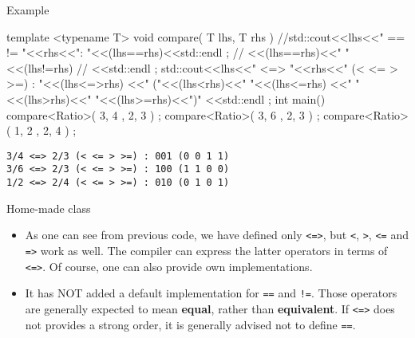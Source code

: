 \begin{frame}[fragile]
  \scriptsize
  \begin{exampleblock}{Example}
    \begin{cppcode*}{}
    template <typename T>
    void compare( T lhs, T rhs )
    {
      //std::cout<<lhs<<" == != "<<rhs<<": "<<(lhs==rhs)<<std::endl ;
      //  <<(lhs==rhs)<<" "<<(lhs!=rhs)
      //  <<std::endl ;
      std::cout<<lhs<<" <=> "<<rhs<<" (< <= > >=) : "<<(lhs<=>rhs)
        <<" ("<<(lhs<rhs)<<" "<<(lhs<=rhs)
        <<" "<<(lhs>rhs)<<" "<<(lhs>=rhs)<<")"
        <<std::endl ;
    }
    int main()
    {
      compare<Ratio>({ 3, 4 },{ 2, 3 }) ;
      compare<Ratio>({ 3, 6 },{ 2, 3 }) ;
      compare<Ratio>({ 1, 2 },{ 2, 4 }) ;
    }
     \end{cppcode*}
  \end{exampleblock}
  \begin{Verbatim}
3/4 <=> 2/3 (< <= > >=) : 001 (0 0 1 1)
3/6 <=> 2/3 (< <= > >=) : 100 (1 1 0 0)
1/2 <=> 2/4 (< <= > >=) : 010 (0 1 0 1)
  \end{Verbatim}
\end{frame}

\begin{frame}[fragile]
  \begin{block}{Home-made class}
    \begin{itemize}
      \item As one can see from previous code, we have defined only \texttt{<=>}, but \texttt{<}, \texttt{>}, \texttt{<=} and \texttt{=>} work as well. The compiler can express the latter operators in terms of \texttt{<=>}. Of course, one can also provide own implementations.
      \item It has NOT added a default implementation for \texttt{==} and \texttt{!=}. Those operators are generally expected to mean \textbf{equal}, rather than \textbf{equivalent}. If \texttt{<=>} does not provides a strong order, it is generally advised not to define \texttt{==}.
    \end{itemize}
  \end{block}
\end{frame}


